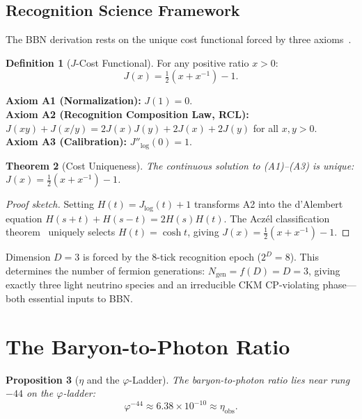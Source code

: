 \documentclass[12pt,a4paper]{article}
\newtheorem{theorem}{Theorem}[section]
\newtheorem{proposition}[theorem]{Proposition}
\theoremstyle{definition}
\newtheorem{definition}[theorem]{Definition}
\theoremstyle{remark}
\begin{document}
\subsection{Recognition Science Framework}
\label{sec:framework}

The BBN derivation rests on the unique cost functional forced by
three axioms~\cite{RS_Axioms}.

\begin{definition}[$J$-Cost Functional]
For any positive ratio $x > 0$:
\begin{equation}
  J(x) = \tfrac{1}{2}(x + x^{-1}) - 1.
\end{equation}
\end{definition}

\noindent\textbf{Axiom A1 (Normalization):} $J(1) = 0$.\\
\textbf{Axiom A2 (Recognition Composition Law, RCL):}
$J(xy)+J(x/y)=2J(x)J(y)+2J(x)+2J(y)$ for all $x,y>0$.\\
\textbf{Axiom A3 (Calibration):} $J''_{\log}(0) = 1$.

\begin{theorem}[Cost Uniqueness]
\label{thm:cost-unique}
The continuous solution to \textup{(A1)--(A3)} is unique:
$J(x) = \tfrac{1}{2}(x + x^{-1}) - 1$.
\end{theorem}

\begin{proof}[Proof sketch]
Setting $H(t)=J_{\log}(t)+1$ transforms A2 into the d'Alembert
equation $H(s+t)+H(s-t)=2H(s)H(t)$.  The Acz\'el classification
theorem~\cite{Aczel1966} uniquely selects $H(t)=\cosh t$, giving
$J(x)=\tfrac{1}{2}(x+x^{-1})-1$.
\end{proof}

\noindent Dimension $D=3$ is forced by the 8-tick recognition epoch
($2^D=8$).  This determines the number of fermion generations:
$N_{\mathrm{gen}} = f(D) = D = 3$, giving exactly three light neutrino
species and an irreducible CKM CP-violating phase---both essential
inputs to BBN.

\section{The Baryon-to-Photon Ratio}
\label{sec:eta}

\begin{proposition}[$\eta$ and the $\varphi$-Ladder]
\label{prop:eta}
The baryon-to-photon ratio lies near rung $-44$ on the
$\varphi$-ladder:
\begin{equation}
  \boxed{\varphi^{-44} \approx 6.38 \times 10^{-10}
  \approx \eta_{\mathrm{obs}}.}
\end{equation}
\end{proposition}
\end{document}
